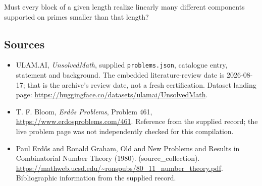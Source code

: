 \documentclass[11pt,a4paper]{article}
\begin{document}
Must every block of a given length realize linearly many different components supported on primes smaller than that length?

\subsection{Sources}

{\small

\begin{itemize}

\item[\hypertarget{source:statement:1}{S1}] ULAM.AI, \emph{UnsolvedMath}, supplied \texttt{problems.json}, catalogue entry, statement and background. The embedded literature-review date is 2026-08-17; that is the archive’s review date, not a fresh certification. Dataset landing page: \url{https://huggingface.co/datasets/ulamai/UnsolvedMath}.

\item[\hypertarget{source:statement:2}{S2}] T. F. Bloom, \emph{Erdős Problems}, Problem 461, \url{https://www.erdosproblems.com/461}. Reference from the supplied record; the live problem page was not independently checked for this compilation.

\item[\hypertarget{source:statement:3}{S3}] Paul Erdős and Ronald Graham, Old and New Problems and Results in Combinatorial Number Theory (1980). (source\_collection). \url{https://mathweb.ucsd.edu/~ronspubs/80_11_number_theory.pdf}. Bibliographic information from the supplied record.

\end{itemize}

}

\label{end:statement}
\end{document}
